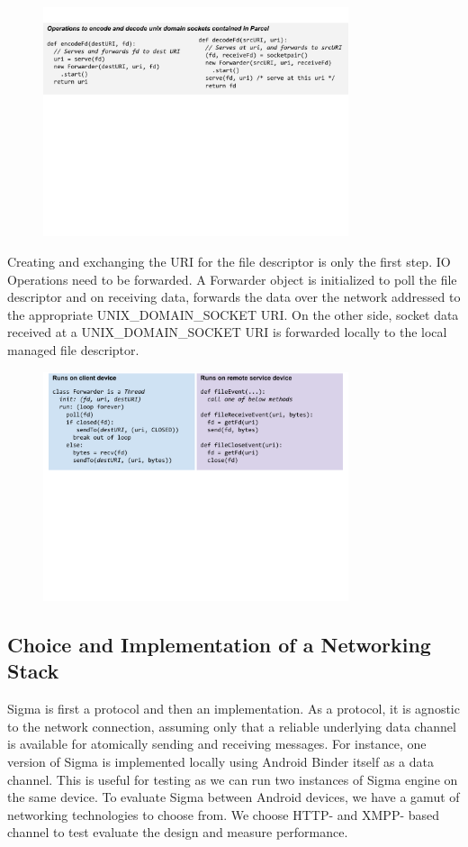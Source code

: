 \documentclass[prodmode]{acmlarge}
\begin{document}
\begin{figure}[h]
\centering
\includegraphics[width=0.8\textwidth]{drawings/encodeFds.pdf}
\end{figure}

Creating and exchanging the URI for the file descriptor is only the first step. IO Operations need to be forwarded. A Forwarder object is initialized to poll the file descriptor and on receiving data, forwards the data over the network addressed to the appropriate UNIX\_DOMAIN\_SOCKET URI. On the other side, socket data received at a UNIX\_DOMAIN\_SOCKET URI is forwarded locally to the local managed file descriptor.
\begin{figure}[h]
\centering
\includegraphics[width=0.8\textwidth]{drawings/forwardFds.pdf}
\end{figure}

\subsection{Choice and Implementation of a Networking Stack}
Sigma is first a protocol and then an implementation. As a protocol, it is agnostic to the network connection, assuming only that a reliable underlying data channel is available for atomically sending and receiving messages. For instance, one version of Sigma is implemented locally using Android Binder itself as a data channel. This is useful for testing as we can run two instances of Sigma engine on the same device. To evaluate Sigma between Android devices, we have a gamut of networking technologies to choose from. We choose HTTP- and XMPP- based channel to test evaluate the design and measure performance.
\end{document}
